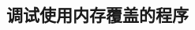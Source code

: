 \documentclass[class=book, crop=false]{standalone}
\begin{document}
\begin{CJK}{UTF8}{gbsn}

\chapter{调试使用内存覆盖的程序}











\cleardoublepage

\end{CJK}
\end{document}
